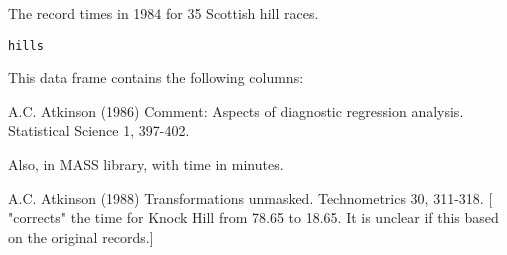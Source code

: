 \begin{Description}\relax
The record times in 1984 for 35 Scottish hill races.
\end{Description}
\begin{Usage}
\begin{verbatim}hills\end{verbatim}
\end{Usage}
\begin{Format}\relax
This data frame contains the following columns:
\end{Format}
\begin{Source}\relax
A.C. Atkinson (1986) Comment: Aspects of diagnostic regression
analysis. Statistical Science  1, 397-402.

Also, in MASS library, with time in minutes.
\end{Source}
\begin{References}\relax
A.C. Atkinson (1988) Transformations unmasked. Technometrics 30,
311-318. [ "corrects" the time for Knock Hill from 78.65 to 18.65. It   
is unclear if this based on the original records.]
\end{References}
